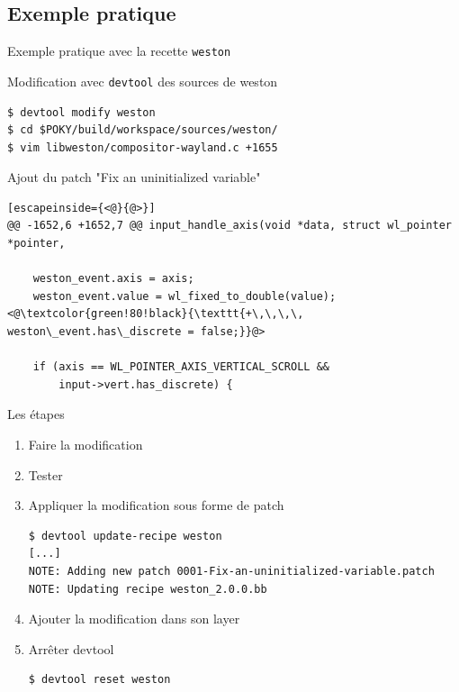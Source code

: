 \documentclass[compress]{smilebeamer}
\begin{document}
\subsection{Exemple pratique}

\begin{frame}
\begin{center}
\textcolor{smileOrange}{\huge{Exemple pratique avec la recette \texttt{weston}}}
\end{center}
\end{frame}

\begin{frame}[fragile]
Modification avec \texttt{devtool} des sources de weston
\begin{lstlisting}[style=shell]
$ devtool modify weston
$ cd $POKY/build/workspace/sources/weston/
$ vim libweston/compositor-wayland.c +1655
\end{lstlisting}

Ajout du patch "Fix an uninitialized variable"
\begin{lstlisting}[escapeinside={<@}{@>}]
@@ -1652,6 +1652,7 @@ input_handle_axis(void *data, struct wl_pointer *pointer,
 
 	weston_event.axis = axis;
 	weston_event.value = wl_fixed_to_double(value);
<@\textcolor{green!80!black}{\texttt{+\,\,\,\, weston\_event.has\_discrete = false;}}@>
 
 	if (axis == WL_POINTER_AXIS_VERTICAL_SCROLL &&
 	    input->vert.has_discrete) {
\end{lstlisting}
\end{frame}

\begin{frame}[fragile]
Les étapes
\begin{enumerate}
\item Faire la modification
\item Tester
\item Appliquer la modification sous forme de patch
\begin{lstlisting}[style=shell]
$ devtool update-recipe weston
[...]
NOTE: Adding new patch 0001-Fix-an-uninitialized-variable.patch
NOTE: Updating recipe weston_2.0.0.bb
\end{lstlisting}
\item Ajouter la modification dans son layer
\item Arrêter devtool
\begin{lstlisting}[style=shell]
$ devtool reset weston
\end{lstlisting}
\end{enumerate}
\end{frame}
\end{document}
